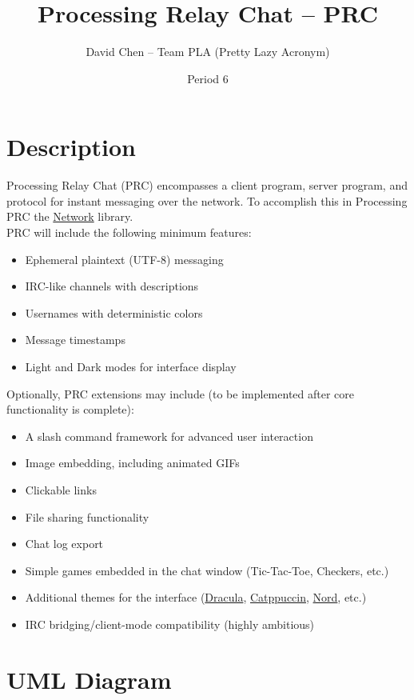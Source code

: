 \documentclass{article}
\title{Processing Relay Chat -- PRC}
\author{David Chen -- Team PLA (Pretty Lazy Acronym)}
\date{Period 6}
\begin{document}
\maketitle

\section{Description}
Processing Relay Chat (PRC) encompasses a client program, server program, and protocol for instant messaging over the network. To accomplish this in Processing PRC the \href{https://processing.org/reference/libraries/net/index.html}{Network} library.\\
PRC will include the following minimum features:
\begin{itemize}
    \item Ephemeral plaintext (UTF-8) messaging
    \item IRC-like channels with descriptions
    \item Usernames with deterministic colors
    \item Message timestamps
    \item Light and Dark modes for interface display
\end{itemize}

Optionally, PRC extensions may include (to be implemented after core functionality is complete):
\begin{itemize}
    \item A slash command framework for advanced user interaction
    \item Image embedding, including animated GIFs
    \item Clickable links
    \item File sharing functionality
    \item Chat log export
    \item Simple games embedded in the chat window (Tic-Tac-Toe, Checkers, etc.)
    \item Additional themes for the interface (\href{https://draculatheme.com/}{Dracula}, \href{https://catppuccin.com/}{Catppuccin}, \href{https://www.nordtheme.com/}{Nord}, etc.)
    \item IRC bridging/client-mode compatibility (highly ambitious)
\end{itemize}

\section{UML Diagram}
\end{document}
